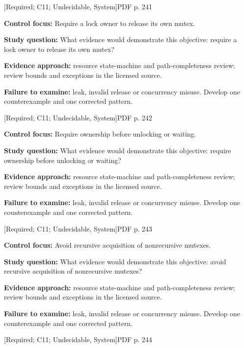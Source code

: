 \documentclass[10pt,letterpaper]{article}
\begin{document}
 \textsf{\footnotesize [Required; C11; Undecidable, System]}\hfill{\footnotesize PDF p. 241}\par
\textbf{Control focus:} Require a lock owner to release its own mutex.\par
\textbf{Study question:} What evidence would demonstrate this objective: require a lock owner to release its own mutex?\par
\textbf{Evidence approach:} resource state-machine and path-completeness review; review bounds and exceptions in the licensed source.\par
\textbf{Failure to examine:} leak, invalid release or concurrency misuse. Develop one counterexample and one corrected pattern.\par
\smallskip
{}
 \textsf{\footnotesize [Required; C11; Undecidable, System]}\hfill{\footnotesize PDF p. 242}\par
\textbf{Control focus:} Require ownership before unlocking or waiting.\par
\textbf{Study question:} What evidence would demonstrate this objective: require ownership before unlocking or waiting?\par
\textbf{Evidence approach:} resource state-machine and path-completeness review; review bounds and exceptions in the licensed source.\par
\textbf{Failure to examine:} leak, invalid release or concurrency misuse. Develop one counterexample and one corrected pattern.\par
\smallskip
{}
 \textsf{\footnotesize [Required; C11; Undecidable, System]}\hfill{\footnotesize PDF p. 243}\par
\textbf{Control focus:} Avoid recursive acquisition of nonrecursive mutexes.\par
\textbf{Study question:} What evidence would demonstrate this objective: avoid recursive acquisition of nonrecursive mutexes?\par
\textbf{Evidence approach:} resource state-machine and path-completeness review; review bounds and exceptions in the licensed source.\par
\textbf{Failure to examine:} leak, invalid release or concurrency misuse. Develop one counterexample and one corrected pattern.\par
\smallskip
{}
 \textsf{\footnotesize [Required; C11; Undecidable, System]}\hfill{\footnotesize PDF p. 244}\par
\end{document}
